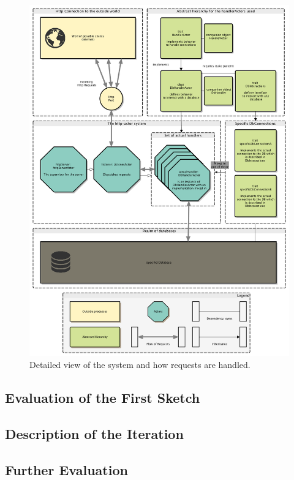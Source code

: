 \documentclass[11p]{scrartcl}
\begin{document}
\begin{figure}[h!]		
 	\includegraphics[scale=0.35]{figures/requestFlow.png}
	\caption{Detailed view of the system and how requests are handled. }
	\label{fig:requestFlow}
\end{figure}

\subsection{Evaluation of the First Sketch}
\subsection{Description of the Iteration}
\subsection{Further Evaluation}
\end{document}
